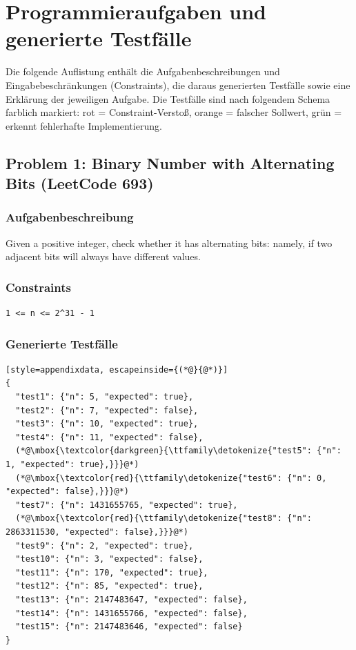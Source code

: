 \section{Programmieraufgaben und generierte Testfälle}
\label{anhang:programmieraufgaben-testfaelle}

Die folgende Auflistung enthält die Aufgabenbeschreibungen und Eingabebeschränkungen (Constraints), die daraus generierten Testfälle 
sowie eine Erklärung der jeweiligen Aufgabe. Die Testfälle sind nach folgendem Schema farblich markiert:
rot = Constraint-Verstoß,
orange = falscher Sollwert,
grün = erkennt fehlerhafte Implementierung.

\subsection{Problem 1: Binary Number with Alternating Bits (LeetCode 693)}

\subsubsection*{Aufgabenbeschreibung}
Given a positive integer, check whether it has alternating bits: namely, if two adjacent bits will always have different values.

\subsubsection*{Constraints}
\begin{lstlisting}[style=appendixdata]
1 <= n <= 2^31 - 1
\end{lstlisting} 

\subsubsection*{Generierte Testfälle}
\begin{lstlisting}[style=appendixdata, escapeinside={(*@}{@*)}]
{
  "test1": {"n": 5, "expected": true},
  "test2": {"n": 7, "expected": false},
  "test3": {"n": 10, "expected": true},
  "test4": {"n": 11, "expected": false},
  (*@\mbox{\textcolor{darkgreen}{\ttfamily\detokenize{"test5": {"n": 1, "expected": true},}}}@*)
  (*@\mbox{\textcolor{red}{\ttfamily\detokenize{"test6": {"n": 0, "expected": false},}}}@*)
  "test7": {"n": 1431655765, "expected": true},
  (*@\mbox{\textcolor{red}{\ttfamily\detokenize{"test8": {"n": 2863311530, "expected": false},}}}@*)
  "test9": {"n": 2, "expected": true},
  "test10": {"n": 3, "expected": false},
  "test11": {"n": 170, "expected": true},
  "test12": {"n": 85, "expected": true},
  "test13": {"n": 2147483647, "expected": false},
  "test14": {"n": 1431655766, "expected": false},
  "test15": {"n": 2147483646, "expected": false}
}
\end{lstlisting}

